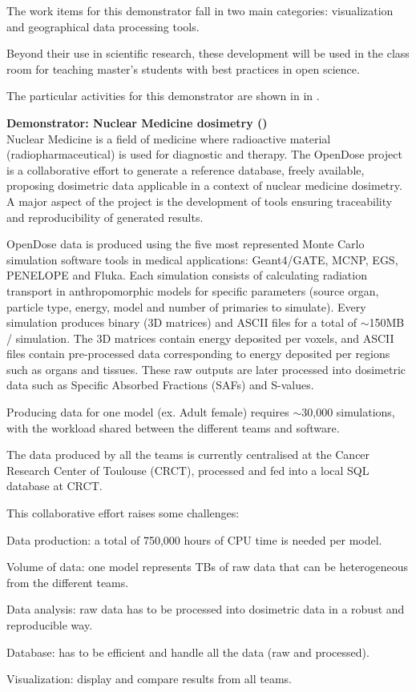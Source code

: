 The work items for this demonstrator fall in two main categories:
visualization and geographical data processing tools.

Beyond their use in scientific research, these development will be used in
the class room for teaching master's students with best practices in open
science.

The particular activities for this demonstrator are shown in
   in .

\medskip
\noindent\textbf{Demonstrator: Nuclear Medicine dosimetry ()}\label{sec:concept-demonstrators-opendose}\\
  Nuclear Medicine is a field of medicine where radioactive material
  (radiopharmaceutical) is used for diagnostic and therapy. The OpenDose
  project \cite{Chauvin2017} is a collaborative effort to generate a reference
  database, freely available, proposing dosimetric data applicable in a context
  of nuclear medicine dosimetry.  A major aspect of the project is the
  development of tools ensuring traceability and reproducibility of generated
  results.

  OpenDose data is produced using the five most represented Monte Carlo
  simulation software tools in medical applications: Geant4/GATE, MCNP, EGS, PENELOPE
  and Fluka. Each simulation consists of calculating radiation transport in
  anthropomorphic models for specific parameters (source organ, particle type,
  energy, model and number of primaries to simulate). Every simulation produces
  binary (3D matrices) and ASCII files for a total of $\sim$150MB / simulation.
  The 3D matrices contain energy deposited per voxels, and ASCII files contain
  pre-processed data corresponding to energy deposited per regions such as
  organs and tissues. These raw outputs are later processed into dosimetric
  data such as Specific Absorbed Fractions (SAFs) and S-values.

  Producing data for one model (ex. Adult female) requires $\sim$30,000
  simulations, with the workload shared between the different teams and
  software.

  The data produced by all the teams is currently centralised at the Cancer
  Research Center of Toulouse (CRCT), processed and fed into a local SQL
  database at CRCT.

  This collaborative effort raises some challenges:
  \begin{compactitem}
  \item Data production: a total of 750,000 hours of CPU time is needed per
    model.
  \item Volume of data: one model represents TBs of raw data that can be
    heterogeneous from the different teams.
  \item Data analysis: raw data has to be processed into dosimetric data in a
    robust and reproducible way.
  \item Database: has to be efficient and handle all the data (raw and
    processed).
  \item Visualization: display and compare results from all teams.
  \end{compactitem}

